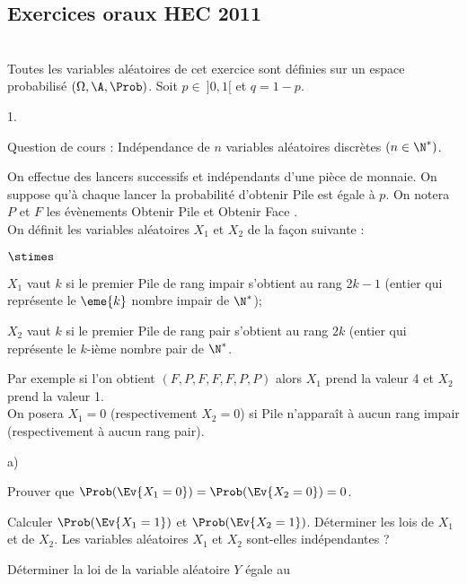 \subsection*{Exercices oraux HEC 2011}


\begin{exerciceAP}~\\
  Toutes les variables aléatoires de cet exercice sont définies sur un
  espace probabilisé $(\Omega , \A , \Prob)$. Soit $p \in \ ]0, 1[$ et
  $q = 1-p$.
  \begin{noliste}{1.}
    \setlength{\itemsep}{2mm}
  \item Question de cours : Indépendance de $n$ variables aléatoires
    discrètes $(n \in \N^*)$.
  \item On effectue des lancers successifs et indépendants d'une pièce
    de monnaie. On suppose qu'à chaque lancer la probabilité d'obtenir
    Pile est égale à $p$. On notera $P$ et $F$ les évènements \og
    Obtenir Pile \fg{} et \og Obtenir Face \fg{}.\\
    On définit les variables aléatoires $X_1$ et $X_2$ de la façon
    suivante :
    \begin{noliste}{$\stimes$}
    \item $X_1$ vaut $k$ si le premier Pile de rang impair s'obtient
      au rang $2k-1$ (entier qui représente le $\eme{k}$ nombre impair
      de $\N^*$);
    \item $X_2$ vaut $k$ si le premier Pile de rang pair s'obtient au
      rang $2k$ (entier qui représente le $k$-ième nombre pair de
      $\N^*$.
    \end{noliste}
    Par exemple si l'on obtient $(F , P , F , F , F , P , P)$ alors
    $X_1$ prend la valeur 4 et $X_2$ prend la valeur 1.\\
    On posera $X_1 = 0$ (respectivement $X_2=0$) si Pile n'apparaît à
    aucun rang impair (respectivement à aucun rang pair).
    \begin{noliste}{a)}
      \setlength{\itemsep}{2mm}
    \item Prouver que $\Prob(\Ev{X_1 = 0}) = \Prob(\Ev{X_2 = 0}) = 0$.
    \item Calculer $\Prob(\Ev{X_1 = 1})$ et $\Prob(\Ev{X_2 =
        1})$. Déterminer les lois de $X_1$ et de $X_2$. Les variables
      aléatoires $X_1$ et $X_2$ sont-elles indépendantes ?
    \item Déterminer la loi de la variable aléatoire $Y$ égale au

\end{noliste}
\end{noliste}
\end{exerciceAP}
